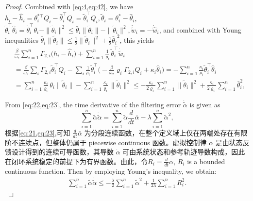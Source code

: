 \documentclass[pdflatex,sn-mathphys-num]{sn-jnl}%
\theoremstyle{thmstyleone}%
\theoremstyle{thmstyletwo}%
\theoremstyle{thmstylethree}%
\begin{document}
\begin{proof}
Combined with \cref{eq:4,eq:42}, we have $h_i-\hat h_i=\theta_{i}^{*\top}Q_i-\hat \theta_{i}^{\top}Q_i
=\tilde \theta_{i}^{\!\top}Q_i, \tilde \theta_{i}=\theta_{i}^{*}-\hat \theta_{i}$, $\tilde \theta_{i}^\top\hat \theta_{i}   =\tilde \theta_{i}^\top \theta_{i}- \|\tilde \theta_{i}\|^2
\le \bar \theta_{i}\|\tilde \theta_{i}\| - \|\tilde \theta_{i}\|^2, \dot{\tilde w}_i=-\dot{\hat w}_i$, and combined with Young inequalities $\bar \theta_{i}\|\tilde \theta_{i}\| \le \frac12\|\tilde \theta_{i}\|^{2}
	+\frac12{\bar \theta_{i}}^{2}$, this yields
	\begin{equation}\label{eq:47}
		\begin{aligned}
				&\frac{\beta}{\omega_{2}}
				  \sum_{i=1}^{n}
					\varGamma_{2,i}\bigl(h_i-\hat h_i\bigr)
				 +\sum_{i=1}^{n}
					\frac{1}{\varrho_i}\,\tilde \theta_{i}^{\top}\dot{\tilde w}_i \\
					&= \frac{\beta}{\omega_{2}} \sum_{i}
					\varGamma_{2,i}\tilde \theta_{i}^{\top}Q_i
				 -\sum_{i}
					\frac{1}{\varrho_i}\tilde \theta_{i}^{\top}
					\bigl(
						-\frac{\beta}{\omega_{2}}\varrho_i
						 \varGamma_{2,i}Q_i
						+\kappa_i\hat \theta_{i}
					\bigr)                                                    = -\sum_{i=1}^{n}\frac{\kappa_i}{\varrho_i}\tilde \theta_{i}^{\top}\hat \theta_{i}       \\
					&  =\sum_{i=1}^n \frac{\kappa_i}{\varrho_i}\,\theta_{i}\|\tilde \theta_{i}\|
				- \sum_{i=1}^n \frac{\kappa_i}{\varrho_i}\,\|\tilde \theta_{i}\|^2 \le
				- \frac{\kappa_i}{2\varrho_i}\sum_{i=1}^n \|\tilde \theta_{i}\|^2+\frac{\kappa_i}{2\varrho_i}\sum_{i=1}^n \bar \theta_{i}^2,		
			\end{aligned}
		\end{equation}

From \cref{eq:22,eq:23}, the time derivative of the filtering error $\dot{\tilde{\alpha}}$ is given as
\begin{equation}\label{eq:48}
	\sum_{i=1}^{n}{\tilde{\alpha}}\dot{\tilde{\alpha}}= \sum_{i=1}^{n}{\tilde{\alpha}} \frac{d}{dt}\bar{\alpha}-\lambda\sum_{i=1}^{n}{\tilde{\alpha}}^2,
\end{equation}
根据\cref{eq:21,eq:23},可知 $\frac{d}{dt} \bar{\alpha}$ 为分段连续函数，在整个定义域上仅在两端处存在有限阶不连续点，但整体仍属于 piecewise continuous 函数。虚拟控制律 $\alpha$ 是由状态反馈设计得到的连续可导函数，其导数 $\dot{\alpha}$ 可由系统状态和参考轨迹导数构成，因此在闭环系统稳定的前提下为有界函数。由此，令$R_i=\frac{d}{dt} \bar{\alpha}$, $R_i$ is a bounded continuous function.
Then by employing Young's inequality, we obtain:
\begin{equation}\label{eq:49}
	\begin{aligned}
		\sum_{i=1}^{n}{\tilde{\alpha}}\dot{\tilde{\alpha}}\leq -\frac{\lambda}{2} \sum_{i=1}^{n} {\tilde{\alpha}}^{2} + \frac{1}{2\lambda} \sum_{i=1}^{n}R_{i}^2. 
	\end{aligned}
\end{equation}






\end{proof}
\end{document}
